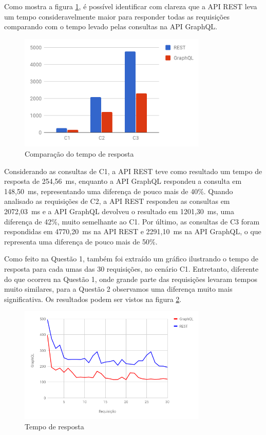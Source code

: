 Como mostra a figura \ref{fig:q2-time}, é possível identificar com clareza que a API REST leva um tempo consideravelmente maior para responder todas as requisições comparando com o tempo levado pelas consultas na API GraphQL.

\begin{figure}[htbp]
    \centering
    \includegraphics[width=0.8\textwidth]{figuras/q2-time.png}
    \caption{Comparação do tempo de resposta}
    \label{fig:q2-time}
    \author{fonte: Autor}
\end{figure}

Considerando as consultas de C1, a API REST teve como resultado um tempo de resposta de 254,56~ms, enquanto a API GraphQL respondeu a consulta em 148,50~ms, representando uma diferença de pouco mais de 40\%. Quando analisado as requisições de C2, a API REST respondeu as consultas em 2072,03~ms e a API GraphQL devolveu o resultado em 1201,30~ms, uma diferença de 42\%, muito semelhante ao C1. Por último, as consultas de C3 foram respondidas em 4770,20~ms na API REST e 2291,10~ms na API GraphQL, o que representa uma diferença de pouco mais de 50\%.

Como feito na Questão 1, também foi extraído um gráfico ilustrando o tempo de resposta para cada umas das 30 requisições, no cenário C1. Entretanto, diferente do que ocorreu na Questão 1, onde grande parte das requisições levaram tempos muito similares, para a Questão 2 observamos uma diferença muito mais significativa. Os resultados podem ser vistos na figura \ref{fig:q2-time-line}.

\begin{figure}[htbp]
    \centering
    \includegraphics[width=0.8\textwidth]{figuras/q2-time-line.png}
    \caption{Tempo de resposta}
    \label{fig:q2-time-line}
\end{figure}

